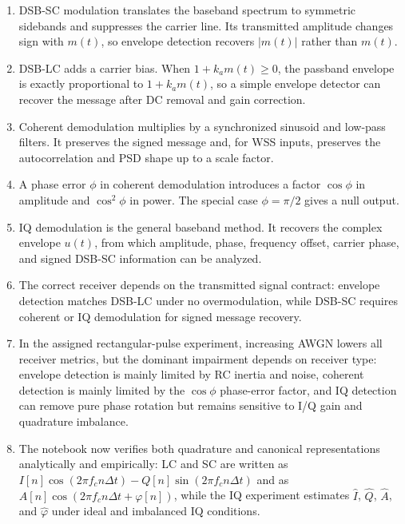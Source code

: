 \documentclass[11pt]{article}
\begin{document}
\begin{enumerate}
\item DSB-SC modulation translates the baseband spectrum to symmetric sidebands and suppresses the carrier line. Its transmitted amplitude changes sign with $m(t)$, so envelope detection recovers $|m(t)|$ rather than $m(t)$.
\item DSB-LC adds a carrier bias. When $1+k_a m(t)\geq 0$, the passband envelope is exactly proportional to $1+k_a m(t)$, so a simple envelope detector can recover the message after DC removal and gain correction.
\item Coherent demodulation multiplies by a synchronized sinusoid and low-pass filters. It preserves the signed message and, for WSS inputs, preserves the autocorrelation and PSD shape up to a scale factor.
\item A phase error $\phi$ in coherent demodulation introduces a factor $\cos\phi$ in amplitude and $\cos^2\phi$ in power. The special case $\phi=\pi/2$ gives a null output.
\item IQ demodulation is the general baseband method. It recovers the complex envelope $u(t)$, from which amplitude, phase, frequency offset, carrier phase, and signed DSB-SC information can be analyzed.
\item The correct receiver depends on the transmitted signal contract: envelope detection matches DSB-LC under no overmodulation, while DSB-SC requires coherent or IQ demodulation for signed message recovery.
\item In the assigned rectangular-pulse experiment, increasing AWGN lowers all receiver metrics, but the dominant impairment depends on receiver type: envelope detection is mainly limited by RC inertia and noise, coherent detection is mainly limited by the $\cos\phi$ phase-error factor, and IQ detection can remove pure phase rotation but remains sensitive to I/Q gain and quadrature imbalance.
\item The notebook now verifies both quadrature and canonical representations analytically and empirically: LC and SC are written as $I[n]\cos(2\pi f_c n\Delta t)-Q[n]\sin(2\pi f_c n\Delta t)$ and as $A[n]\cos(2\pi f_c n\Delta t+\varphi[n])$, while the IQ experiment estimates $\widehat{I}$, $\widehat{Q}$, $\widehat{A}$, and $\widehat{\varphi}$ under ideal and imbalanced IQ conditions.
\end{enumerate}
\end{document}
